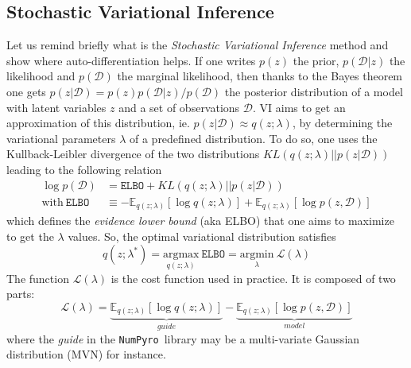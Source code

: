 \documentclass[twocolumn,twocolappendix,nofootinbib,iop]{openjournal}
\newcommand{\numpyro}{\texttt{NumPyro}}
\begin{document}
\subsection{Stochastic Variational Inference}
\label{sec-SVI}
%
Let us remind briefly what is the \textit{Stochastic Variational Inference} method \citep{2012arXiv1206.7051H, 2017arXiv171105597Z} and show where auto-differentiation helps. If one  writes $p(z)$ the prior, $p(\mathcal{D}|z)$ the likelihood and $p(\mathcal{D})$ the marginal likelihood, then thanks to the  Bayes theorem one gets $p(z|\mathcal{D})=p(z)p(\mathcal{D}|z)/p(\mathcal{D})$ the posterior distribution of a model with latent variables $z$ and a set of observations $\mathcal{D}$. VI aims to get an approximation of this distribution, ie. $p(z|\mathcal{D}) \approx q(z;\lambda)$, by determining the variational parameters $\lambda$ of a predefined distribution. To do so, one uses the Kullback-Leibler divergence of the two distributions $KL(q(z;\lambda)||p(z|\mathcal{D}))$ leading to the following relation
\begin{align}
\log p(\mathcal{D}) &= \mathtt{ELBO} +  KL(q(z;\lambda)||p(z|\mathcal{D})) \label{eq-ELBO} \\
\mathrm{with} \ \mathtt{ELBO} &\equiv -\mathbb{E}_{q(z;\lambda)}\left[ \log q(z;\lambda)\right] + \mathbb{E}_{q(z;\lambda)}\left[ \log p(z,\mathcal{D}) \right] 
\end{align}
which defines the \textit{evidence lower bound} (aka ELBO) that one aims to maximize to get the $\lambda$ values. So, the optimal variational distribution satisfies
\begin{equation}
q(z;\lambda^\ast) = \underset{q(z;\lambda)}{\mathrm{argmax}}\  \mathtt{ELBO} = 
\underset{\lambda}{\mathrm{argmin}}\ \mathcal{L}(\lambda)
\end{equation}
The function $\mathcal{L}(\lambda)$ is the cost function used in practice. It is composed of two parts:
\begin{equation}
\mathcal{L}(\lambda) = \underbrace{\mathbb{E}_{q(z;\lambda)}\left[ \log q(z;\lambda)\right]}_{guide} - \underbrace{\mathbb{E}_{q(z;\lambda)}\left[ \log p(z,\mathcal{D}) \right]}_{model}
\label{eq-loss-svi-1}
\end{equation}
where the \textit{guide} in the \numpyro\ library may be a multi-variate Gaussian distribution (MVN) for instance.
\end{document}
